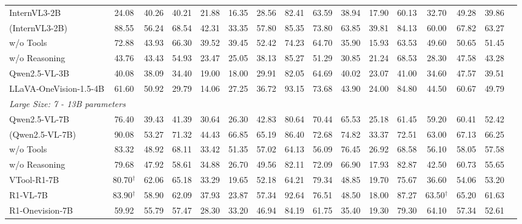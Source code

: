 \begin{table}[t]
{\begin{tabular}{l @{\hskip2.5pt} | c c c c c | c | c c c c c c  | c | c c }
\midrule
InternVL3-2B   & 24.08  &	40.26  &	40.21  &	21.88  &	16.35  &	28.56  &	82.41  &	63.59  &	38.94  &	17.90  &	60.13  &	32.70  &	49.28  &	39.86 \\
\rowcolor{magenta!12} \ours{} (InternVL3-2B) &  88.55 &	56.24 &	68.54 &	42.31 &	33.35 &	57.80 &	85.35 &	73.80 &	63.85 &	39.81 &	84.13 &	60.00 &	67.82 &	63.27 \\
\rowcolor{magenta!3} \quad w/o Tools  &	72.88  &	43.93  &	66.30  &	39.52  &	39.45  &	52.42  &	74.23  &	64.70  &	35.90  &	15.93  &	63.53  &	49.60  &	50.65  &	51.45 \\
\rowcolor{magenta!3} \quad w/o Reasoning & 43.76	& 43.43	& 54.93	& 23.47 &	25.05 &	38.13 &	85.27 &	51.29 &	30.85 &	21.24 &	68.53 &	28.30 & 47.58 &	43.28 	\\
Qwen2.5-VL-3B  & 40.08  &	38.09  &	34.40  &	19.00  &	18.00  &	29.91  &	82.05  &	64.69  &	40.02  &	23.07  &	41.00  &	34.60  &	47.57  &	39.51 \\
LLaVA‑OneVision-1.5-4B 	& 61.60	&	50.92	&	29.79	&	14.06	&	27.25	&	36.72	&	93.15	&	73.68	&	43.90	&	24.00	&	84.80	&	44.50	&	60.67	&	49.79\\
\midrule
\multicolumn{10}{l}{\textit{Large Size: 7 - 13B parameters}}  \\
\midrule
Qwen2.5-VL-7B & 76.40 &	39.43 &	41.39 &	30.64 &	26.30 &	42.83 &	80.64 &	70.44 &	65.53 &	25.18 &	61.45 &	59.20 &	60.41 &	52.42 \\
\rowcolor{teal!15}  \ours{} (Qwen2.5-VL-7B) & 90.08 &	53.27 & 71.32 &	44.43 &	66.85 &	65.19 &	86.40 &	72.68 &	74.82 &	33.37 &	72.51 &	63.00 &	67.13 &	66.25  \\ 
\rowcolor{teal!4}  \quad w/o Tools & 83.32 &	48.92 &	68.11 &	33.42 &	51.35 &	57.02 &	64.13 &	56.09 &	76.45 &	26.92 &	68.58 &	56.10 &	58.05 &	57.58 \\	
\rowcolor{teal!4}  \quad w/o Reasoning & 79.68 &	47.92 &	58.61 &	34.88 &	26.70 &	49.56 &	82.11 &	72.09 &	66.90 &	17.93 &	82.87 &	42.50 &	60.73 &	55.65 \\					
VTool-R1-7B & 80.70$^\dagger$ & 62.06 &	65.18 &	33.29 &	19.65 &	52.18 &	64.21 &	79.34 &	48.85 &	19.70 &	75.67 &	36.60 &	54.06 &	53.20 \\
R1‑VL‑7B & 83.90$^\dagger$ &	58.90 &	62.09 &	37.93 &	23.87 &	57.34 &	92.64 &	76.51 &	48.50 &	18.00 &	87.27 &	63.50$^\dagger$ & 65.20 & 61.63 \\
R1‑Onevision‑7B  &59.92 &	55.79 &	57.47 &	28.30 &	33.20 &	46.94 &	84.19 &	61.75 &	35.40 &	19.30 &	79.30 &	64.10 &	57.34 &	52.61 \\	

\end{tabular}}
\end{table}
